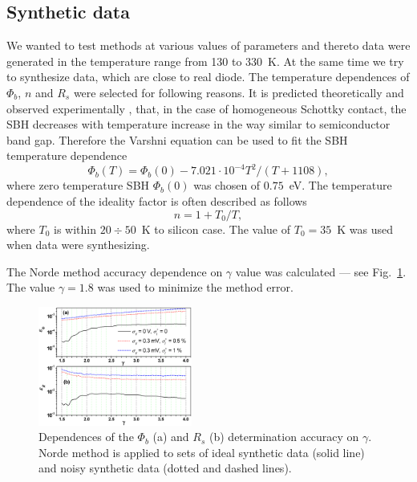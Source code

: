 \documentclass[aip,jap,reprint]{revtex4-1}
\begin{document}
\subsection{Synthetic data\label{SubData}}

We wanted to test methods at various values of parameters and thereto data were generated in the temperature range from 130 to 330~K.
At the same time we try to synthesize data, which are close to real diode.
The temperature dependences of $\Phi_b$, $n$ and $R_s$ were selected for following reasons.
It is predicted theoretically \cite{Rhoderick1988} and observed
experimentally \cite{Aboelfotoh,Zhua}, that, in the case of homogeneous Schottky contact, the SBH decreases with temperature increase in the way similar to semiconductor band gap.
Therefore the Varshni equation \cite{SiEg2012} can be used to fit the SBH temperature dependence
\begin{equation}
\label{eqFbT}
\Phi_b(T) = \Phi_b(0) - 7.021\cdot10^{-4} T^2 /(T + 1108),
\end{equation}
where zero temperature SBH $\Phi_b(0)$ was chosen of $0.75$~eV.
The temperature dependence of the ideality factor is often described as follows
\begin{equation}
\label{eqnT}
n=1+T_0/T,
\end{equation}
where $T_0$ is within $20\div50$~K to silicon case.\cite{T0:Lee,T0:McCafferty,T0:Saxena,Aboelfotoh}
The value of $T_0=35$~K was used when data were synthesizing.

The Norde method accuracy dependence on $\gamma$ value was calculated --- see Fig.~\ref{figNorde}.
The value $\gamma=1.8$ was used to minimize the method error.

\begin{figure}
\includegraphics[width=0.45\textwidth]{fig_1}%
\caption{\label{figNorde}
Dependences of the $\Phi_b$ (a) and $R_s$ (b) determination accuracy on $\gamma$.
Norde method is applied to sets of ideal synthetic data (solid line) and noisy synthetic data (dotted and dashed lines).
}
\end{figure}
\end{document}
